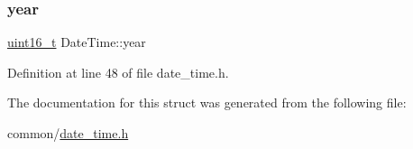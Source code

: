 \mbox{\label{structDateTime_a0a61d60280541502e47f9a7fd6e1c8d2}} 
\subsubsection{\texorpdfstring{year}{year}}
{\footnotesize\ttfamily \hyperlink{stdint_8h_a273cf69d639a59973b6019625df33e30}{uint16\+\_\+t} Date\+Time\+::year}



Definition at line 48 of file date\+\_\+time.\+h.



The documentation for this struct was generated from the following file\+:\begin{DoxyCompactItemize}
\item 
common/\hyperlink{date__time_8h}{date\+\_\+time.\+h}\end{DoxyCompactItemize}
